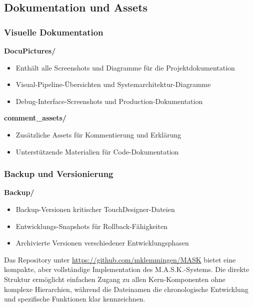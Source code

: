 \subsection{Dokumentation und Assets}

\subsubsection{Visuelle Dokumentation}

\textbf{DocuPictures/}
\begin{itemize}
    \item Enthält alle Screenshots und Diagramme für die Projektdokumentation
    \item Visual-Pipeline-Übersichten und Systemarchitektur-Diagramme
    \item Debug-Interface-Screenshots und Production-Dokumentation
\end{itemize}

\textbf{comment\_assets/}
\begin{itemize}
    \item Zusätzliche Assets für Kommentierung und Erklärung
    \item Unterstützende Materialien für Code-Dokumentation
\end{itemize}

\subsubsection{Backup und Versionierung}

\textbf{Backup/}
\begin{itemize}
    \item Backup-Versionen kritischer TouchDesigner-Dateien
    \item Entwicklungs-Snapshots für Rollback-Fähigkeiten
    \item Archivierte Versionen verschiedener Entwicklungsphasen
\end{itemize}

Das Repository unter \url{https://github.com/mklemmingen/MASK} bietet eine kompakte, aber vollständige Implementation des M.A.S.K.-Systems. Die direkte Struktur ermöglicht einfachen Zugang zu allen Kern-Komponenten ohne komplexe Hierarchien, während die Dateinamen die chronologische Entwicklung und spezifische Funktionen klar kennzeichnen.